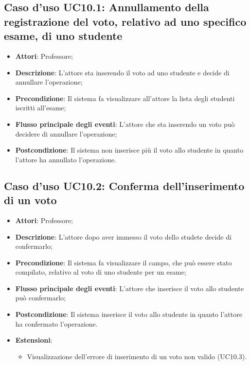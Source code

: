 \subsection{Caso d'uso \texorpdfstring{UC10.1}{UC10.1}: Annullamento della registrazione del voto, relativo ad uno specifico esame, di uno studente}
\begin{itemize}
	\item \textbf{Attori}: Professore;
	\item \textbf{Descrizione}: L'attore sta inserendo il voto ad uno studente e decide di annullare l'operazione;
	\item \textbf{Precondizione}: Il sistema fa visualizzare all'attore la lista degli studenti iscritti all'esame;
	
	\item \textbf{Flusso principale degli eventi}: L'attore che sta inserendo un voto può decidere di annullare l'operazione;
	\item \textbf{Postcondizione}: Il sistema non inserisce più il voto allo studente in quanto l'attore ha annullato l'operazione.
	
\end{itemize}
\subsection{Caso d'uso \texorpdfstring{UC10.2}{UC10.2}: Conferma dell'inserimento di un voto}
\begin{itemize}
	\item \textbf{Attori}: Professore;
	\item \textbf{Descrizione}: L'attore dopo aver immesso il voto dello studete decide di confermarlo;
	\item \textbf{Precondizione}: Il sistema fa visualizzare il campo, che può essere stato compilato, relativo al voto di uno studente per un esame;
	\item \textbf{Flusso principale degli eventi}: L'attore che inserisce il voto allo studente può confermarlo;
	\item \textbf{Postcondizione}: Il sistema inserisce il voto allo studente in quanto l'attore ha confermato l'operazione.
	\item \textbf{Estensioni}:
	\begin{itemize}
		\item Visualizzazione dell'errore di inserimento di un voto non valido (UC10.3).
	\end{itemize}
\end{itemize}
